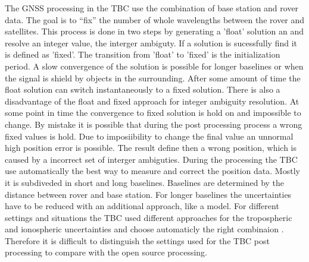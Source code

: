 The GNSS processing in the TBC use the combination of base station and rover data.
The goal is to “fix” the number of whole wavelengths between the rover and satellites.
This process is done in two steps by generating a 'float' solution an and resolve an integer value, the interger ambiguty. 
If a solution is sucessfully find it is defined as 'fixed'.
The transition from 'float' to 'fixed' is the initialization period.
A slow convergence of the solution is possible for longer baselines or when the signal is shield by objects in the surrounding.
After some amount of time the float solution can switch instantaneously to a fixed solution.
There is also a disadvantage of the float and fixed approach for integer ambiguity resolution.
At some point in time the convergence to fixed solution is hold on and impossible to change.
By mistake it is possible that during the post processing process a wrong fixed values is hold. 
Due to imposiibility to change the final value an unnormal high position error is possible. 
The result define then a wrong position, which is caused by a incorrect set of interger ambiguties.
During the processing the TBC use automatically the best way to measure and correct the position data. 
Mostly it is subdiveded in short and long baselines.
Baselines are determined by the distance between rover and base station.
For longer baselines the uncertainties have to be reduced with an additional approach, like a model.
For different settings and situations the TBC used different approaches for the tropospheric and ionospheric uncertainties and choose automaticly the right combinaion \citep{Trprocess}.
Therefore it is difficult to distinguish the settings used for the TBC post processing to compare with the open source processing.
\medskip

